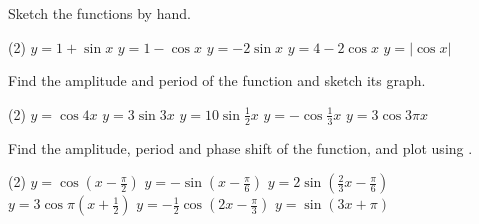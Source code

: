 \begin{Exercise}[title={Trigonometric Functions},label=exTrigonometricFunctions]
	\Question Sketch the functions by hand. 
	\begin{tasks}(2)
		\task 	 $y =1 +\sin  x$ %
		\task 	 $y =1 -\cos  x$ %
		\task 	 $y = -2 \sin  x$ %
		\task 	 $y =4 -2 \cos  x$%
		\task 	 $y =\left \vert \cos  x\right \vert $%
	\end{tasks}
	\Question Find the amplitude and period of the function and sketch its graph. 
	\begin{tasks}(2)
		\task 	$y =\cos  4 x$  %
		\task 	$y =3 \sin  3 x$  %
		\task 	$y =10 \sin  \frac{1}{2} x$ %
		\task 	$y = -\cos  \frac{1}{3} x$ %
		\task   $y =3 \cos  3 \pi  x$%
	\end{tasks}
	\Question Find the amplitude, period and phase shift of the function, and plot using \desmos. 
\begin{tasks}(2)
	\task 	$y =\cos  \left (x -\frac{\pi }{2}\right )$  %
	\task 	$y = -\sin  \left (x -\frac{\pi }{6}\right )$  %
	\task 	$y =2 \sin  \left (\frac{2}{3} x -\frac{\pi }{6}\right )$  %
	\task 	$y =3 \cos  \pi  \left (x +\frac{1}{2}\right )$ %
	\task   $y = -\frac{1}{2} \cos  \left (2 x -\frac{\pi }{3}\right )$ %
	\task	$y =\sin  \left (3 x +\pi \right )$%
\end{tasks}
\end{Exercise}%
